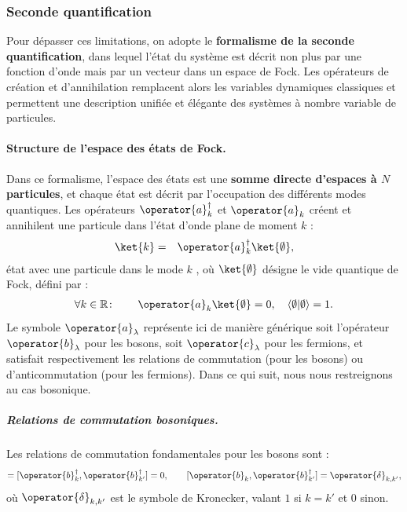 \subsubsection{Seconde quantification}

Pour dépasser ces limitations, on adopte le \textbf{formalisme de la seconde quantification}, dans lequel l’état du système est décrit non plus par une fonction d’onde mais par un vecteur dans un espace de Fock. Les opérateurs de création et d’annihilation remplacent alors les variables dynamiques classiques et permettent une description unifiée et élégante des systèmes à nombre variable de particules.

\paragraph{Structure de l’espace des états de Fock.}
Dans ce formalisme, l’espace des états est une {\bf somme directe d’espaces à $N$ particules}, et chaque état est décrit par l’occupation des différents modes quantiques. Les opérateurs $\operator{a}_k^\dagger$ et $\operator{a}_k$ créent et annihilent une particule dans l’état d’onde plane de moment $k$ :
\begin{eqnarray}
	\ket{k} & = & \operator{a}_k^\dagger \ket{\emptyset} ,%
\end{eqnarray}
état avec une particule dans le mode $k$ , où \(\ket{\emptyset}\) désigne le vide quantique de Fock, défini par :
\begin{eqnarray}
	\forall k \in \mathbb{R}\colon \qquad \operator{a}_k \ket{\emptyset} = 0 ,\quad  \langle \emptyset \vert \emptyset \rangle = 1. \label{chap:eq.vide.fock.k}
\end{eqnarray}
Le symbole \( \operator{a}_\lambda \) représente ici de manière générique soit l’opérateur \( \operator{b}_\lambda \) pour les bosons, soit \( \operator{c}_\lambda \) pour les fermions, et satisfait respectivement les relations de commutation (pour les bosons) ou d’anticommutation (pour les fermions). Dans ce qui suit, nous nous restreignons au cas bosonique.

\subparagraph{Relations de commutation bosoniques.} Les relations de commutation fondamentales pour les bosons sont :
\begin{eqnarray}
	[\operator{b}_k, \operator{b}_{k'}] = [\operator{b}_k^\dagger, \operator{b}_{k'}^\dagger] = 0 ,\qquad [\operator{b}_k, \operator{b}_{k'}^\dagger] = \operator{\delta}_{k,k'}, \label{chap:1:com.1.k}
\end{eqnarray}
où $\operator{\delta}_{k,k'}$ est le symbole de Kronecker, valant $1$ si $k = k'$ et $0$ sinon.


